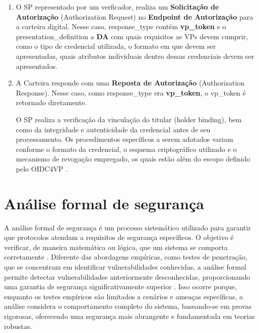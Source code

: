 \begin{enumerate}

    \item O \acs{SP} representado por um verficador, realiza um \textbf{Solicitação de Autorização} (Authorization Request) no \textbf{Endpoint de Autorização} para a carteira digital. Nesse caso, response\_type contém \textbf{vp\_token} e o presentation\_definition a \textbf{\acs{DA}} com quais requisitos as \acs{VP}s devem cumprir, como o tipo de credencial utilizada, o formato em que devem ser apresentadas, quais atributos individuais dentro dessas credenciais devem ser apresentados. 
    
    \item A Carteira responde com uma \textbf{Reposta de Autorização} (Authorization Response). Nesse caso, como response\_type era \textbf{vp\_token}, o vp\_token é retornado diretamente. 

    O \acs{SP} realiza a verificação da vinculação do titular (holder binding), bem como da integridade e autenticidade da credencial antes de seu processamento. Os procedimentos específicos a serem adotados variam conforme o formato da credencial, o esquema criptográfico utilizado e o mecanismo de revogação empregado, os quais estão além do escopo definido pelo \acs{OIDC4VP} \cite{OIDC4VCWhitepaper2022}.

\end{enumerate}

\newpage
\section{Análise formal de segurança}

A análise formal de segurança é um processo sistemático utilizado para garantir que protocolos atendam a requisitos de segurança específicos. O objetivo é verificar, de maneira matemática ou lógica, que um sistema se comporta corretamente \cite{Kulik2020}. Diferente das abordagens empíricas, como testes de penetração, que se concentram em identificar vulnerabilidades conhecidas, a análise formal permite detectar vulnerabilidades anteriormente desconhecidas, proporcionando uma garantia de segurança significativamente superior \cite{hauck2023openid}. Isso ocorre porque, enquanto os testes empíricos são limitados a cenários e ameaças específicas, a análise considera o comportamento completo do sistema, baseando-se em provas rigorosas, oferecendo uma segurança mais abrangente e fundamentada em teorias robustas.

